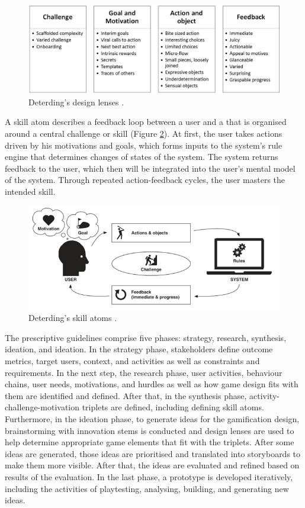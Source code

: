 \documentclass[12pt, a4paper]{report}
\begin{document}
{\begin{figure}[ht]
\centering
\includegraphics[width=12cm]{lenses}
\caption{Deterding's design lenses \cite{deterding2015lens}.}
\label{lenses}
\end{figure}


A skill atom describes a feedback loop between a user and a that is organised around a central challenge or skill (Figure \ref{skill-atoms}). At first, the user takes actions driven by his motivations and goals, which forms inputs to the system's rule engine that determines changes of states of the system. The system returns feedback to the user, which then will be integrated into the user's mental model of the system. Through repeated action-feedback cycles, the user masters the intended skill.

\begin{figure}[ht]
\centering
\includegraphics[width=12cm]{skill-atoms}
\caption{Deterding's skill atoms \cite{deterding2015lens}.}
\label{skill-atoms}
\end{figure}

The prescriptive guidelines comprise five phases: strategy, research, synthesis, ideation, and ideation. In the strategy phase, stakeholders define outcome metrics, target users, context, and activities as well as constraints and requirements. In the next step, the research phase, user activities, behaviour chains, user needs, motivations, and hurdles as well as how game design fits with them are identified and defined. After that, in the synthesis phase, activity-challenge-motivation triplets are defined, including defining skill atoms. Furthermore, in the ideation phase, to generate ideas for the gamification design, brainstorming with innovation stems is conducted and design lenses are used to help determine appropriate game elements that fit with the triplets. After some ideas are generated, those ideas are prioritised and translated into storyboards to make them more visible. After that, the ideas are evaluated and refined based on results of the evaluation. In the last phase, a prototype is developed iteratively, including the activities of playtesting, analysing, building, and generating new ideas. 

}
\end{document}
